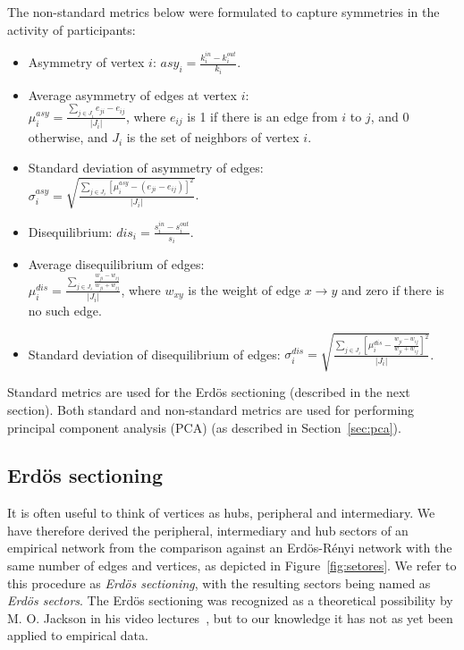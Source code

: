 The non-standard metrics below were formulated to capture symmetries in the activity of participants:

\begin{itemize}
\item Asymmetry of vertex $i$: $asy_i=\frac{k_i^{in}-k_i^{out}}{k_i}$.
\item Average asymmetry of edges at vertex $i$:\\ $\mu_i^{asy}=\frac{\sum_{j\in J_i} e_{ji}-e_{ij}}{|J_i|}$, where $e_{ij}$ is 1 if there is an edge from $i$ to $j$, and $0$ otherwise, and $J_i$ is the set of neighbors of vertex $i$.
\item Standard deviation of asymmetry of edges:\\ $\sigma_i^{asy}=\sqrt{\frac{\sum_{j\in J_i}[\mu^{asy}_i -(e_{ji}-e_{ij}) ]^2 }{|J_i|} }$.
\item Disequilibrium: $dis_i=\frac{s_i^{in}-s_i^{out}}{s_i}$.
\item Average disequilibrium of edges:\\ $\mu_i^{dis}=\frac{\sum_{j \in J_i}\frac{w_{ji}-w_{ij}}{w_{ji}+w_{ij}}}{|J_i|}$, where $w_{xy}$ is the weight of edge $x\rightarrow y$ and zero if there is no such edge.
\item Standard deviation of disequilibrium of edges: $\sigma_i^{dis}=\sqrt{\frac{\sum_{j\in J_i}\left[\mu^{dis}_i-\frac{w_{ji}-w_{ij}}{w_{ji}+w_{ij}}\right]^2}{|J_i|}}$.
\end{itemize}

Standard metrics are used for the Erd\"os sectioning (described in the next section).
Both standard and non-standard metrics are used
for performing principal component analysis (PCA) (as described in Section~\ref{sec:pca}).


\subsection{Erd\"os sectioning}\label{sectioning}
It is often useful to think of vertices as hubs, peripheral and intermediary. We have therefore derived the peripheral, intermediary and hub sectors of an empirical network from the comparison against an Erd\"os-R\'enyi network with the same number of edges and vertices,
as depicted in Figure~\ref{fig:setores}. We refer to this procedure as \emph{Erd\"os sectioning}, with the resulting sectors being named as \emph{Erd\"os sectors}. The Erd\"os sectioning was recognized as a theoretical possibility by M. O. Jackson in his video lectures~\cite{3setores}, but to our knowledge it has not as yet been applied to empirical data.

